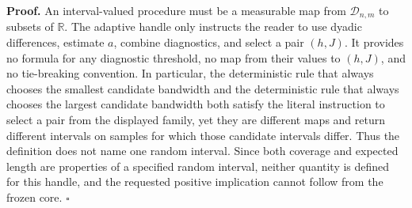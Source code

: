\textbf{Proof.}
An interval-valued procedure must be a measurable map from \(\mathcal D_{n,m}\) to subsets of \(\mathbb R\).  The adaptive handle only instructs the reader to use dyadic differences, estimate \(a\), combine diagnostics, and select a pair \((h,J)\).  It provides no formula for any diagnostic threshold, no map from their values to \((h,J)\), and no tie-breaking convention.  In particular, the deterministic rule that always chooses the smallest candidate bandwidth and the deterministic rule that always chooses the largest candidate bandwidth both satisfy the literal instruction to select a pair from the displayed family, yet they are different maps and return different intervals on samples for which those candidate intervals differ.  Thus the definition does not name one random interval.  Since both coverage and expected length are properties of a specified random interval, neither quantity is defined for this handle, and the requested positive implication cannot follow from the frozen core. \(\square\)
